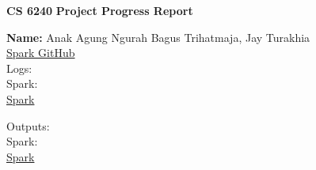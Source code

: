 \documentclass[11pt]{article}
\begin{document}
    \thispagestyle{empty}
    \setlength{\parindent}{0pt}
    \setlength{\parskip}{1.8ex}
    \lstset{language=Scala}
    \newcommand{\hs}{\hspace{.1in}}

    \begin{center}
        \Large{\bf CS 6240}
        \Large{\bf Project Progress Report}
    \end{center}
    \medskip

\begin{center}

{\bf Name:}  Anak Agung Ngurah Bagus Trihatmaja, Jay Turakhia \\
\href{https://github.ccs.neu.edu/prdx/CS6240-Project}{Spark GitHub}  \\

Logs: \\
Spark: \\
\href{https://github.ccs.neu.edu/prdx/CS6240-Project/tree/master/log}{Spark}

Outputs: \\
Spark: \\
\href{https://github.ccs.neu.edu/prdx/CS6240-Project/tree/master/output}{Spark}

\end{center}
\end{document}
